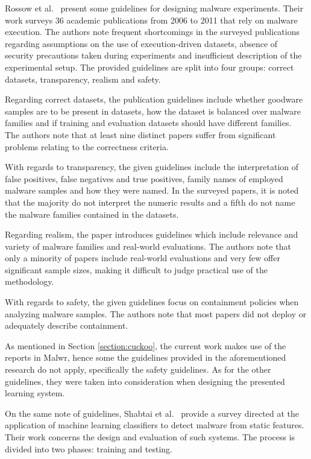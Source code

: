 Rossow et al.~\cite{rossow:practices} present some guidelines for designing malware experiments.
Their work surveys 36 academic publications from 2006 to 2011 that rely on malware execution.
The authors note frequent shortcomings in the surveyed publications regarding assumptions on the use of execution-driven datasets, absence of security precautions taken during experiments and insufficient description of the experimental setup.
The provided guidelines are split into four groups: correct datasets, transparency, realism and safety.

Regarding correct datasets, the publication guidelines include whether goodware samples are to be present in datasets, how the dataset is balanced over malware families and if training and evaluation datasets should have different families.
The authors note that at least nine distinct papers suffer from significant problems relating to the correctness criteria.

With regards to transparency, the given guidelines include the interpretation of false positives, false negatives and true positives, family names of employed malware samples and how they were named.
In the surveyed papers, it is noted that the majority do not interpret the numeric results and a fifth do not name the malware families contained in the datasets.

Regarding realism, the paper introduces guidelines which include relevance and variety of malware families and real-world evaluations.
The authors note that only a minority of papers include real-world evaluations and very few offer significant sample sizes, making it difficult to judge practical use of the methodology.

With regards to safety, the given guidelines focus on containment policies when analyzing malware samples.
The authors note that most papers did not deploy or adequately describe containment.

As mentioned in Section \ref{section:cuckoo}, the current work makes use of the reports in Malwr, hence some the guidelines provided in the aforementioned research do not apply, specifically the safety guidelines.
As for the other guidelines, they were taken into consideration when designing the presented learning system.

\medskip 

On the same note of guidelines, Shabtai et al.~\cite{shabtai:survey} provide a survey directed at the application of machine learning classifiers to detect malware from static features.
Their work concerns the design and evaluation of such systems.
The process is divided into two phases: training and testing.

